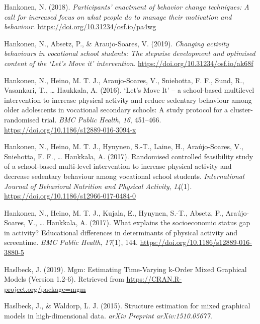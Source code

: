\documentclass[british,man]{apa6}
\begin{document}
\leavevmode\hypertarget{ref-hankonenParticipantsEnactmentBehavior2018}{}%
Hankonen, N. (2018). \emph{Participants' enactment of behavior change techniques: A call for increased focus on what people do to manage their motivation and behaviour}. \url{https://doi.org/10.31234/osf.io/pa4wg}

\leavevmode\hypertarget{ref-hankonenChangingActivityBehaviours2019}{}%
Hankonen, N., Absetz, P., \& Araujo-Soares, V. (2019). \emph{Changing activity behaviours in vocational school students: The stepwise development and optimised content of the `Let's Move it' intervention}. \url{https://doi.org/10.31234/osf.io/ak68f}

\leavevmode\hypertarget{ref-hankonenLetMoveIt2016}{}%
Hankonen, N., Heino, M. T. J., Araujo-Soares, V., Sniehotta, F. F., Sund, R., Vasankari, T., \ldots{} Haukkala, A. (2016). `Let's Move It' -- a school-based multilevel intervention to increase physical activity and reduce sedentary behaviour among older adolescents in vocational secondary schools: A study protocol for a cluster-randomised trial. \emph{BMC Public Health}, \emph{16}, 451--466. \url{https://doi.org/10.1186/s12889-016-3094-x}

\leavevmode\hypertarget{ref-hankonenRandomisedControlledFeasibility2017}{}%
Hankonen, N., Heino, M. T. J., Hynynen, S.-T., Laine, H., Araújo-Soares, V., Sniehotta, F. F., \ldots{} Haukkala, A. (2017). Randomised controlled feasibility study of a school-based multi-level intervention to increase physical activity and decrease sedentary behaviour among vocational school students. \emph{International Journal of Behavioral Nutrition and Physical Activity}, \emph{14}(1). \url{https://doi.org/10.1186/s12966-017-0484-0}

\leavevmode\hypertarget{ref-hankonenWhatExplainsSocioeconomic2017a}{}%
Hankonen, N., Heino, M. T. J., Kujala, E., Hynynen, S.-T., Absetz, P., Araújo-Soares, V., \ldots{} Haukkala, A. (2017). What explains the socioeconomic status gap in activity? Educational differences in determinants of physical activity and screentime. \emph{BMC Public Health}, \emph{17}(1), 144. \url{https://doi.org/10.1186/s12889-016-3880-5}

\leavevmode\hypertarget{ref-haslbeckMgmEstimatingTimeVarying2019}{}%
Haslbeck, J. (2019). Mgm: Estimating Time-Varying k-Order Mixed Graphical Models (Version 1.2-6). Retrieved from \url{https://CRAN.R-project.org/package=mgm}

\leavevmode\hypertarget{ref-haslbeckStructureEstimationMixed2015}{}%
Haslbeck, J., \& Waldorp, L. J. (2015). Structure estimation for mixed graphical models in high-dimensional data. \emph{arXiv Preprint arXiv:1510.05677}.
\end{document}
